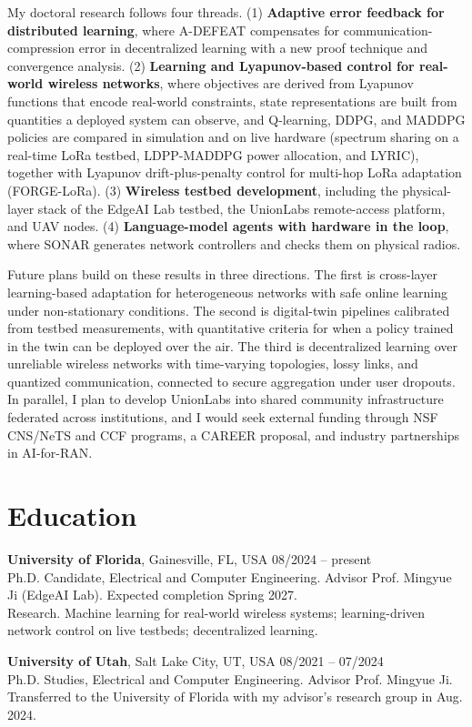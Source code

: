 \documentclass[10pt]{article}
\begin{document}
My doctoral research follows four threads. (1) \textbf{Adaptive error feedback for distributed learning}, where A-DEFEAT compensates for communication-compression error in decentralized learning with a new proof technique and convergence analysis. (2) \textbf{Learning and Lyapunov-based control for real-world wireless networks}, where objectives are derived from Lyapunov functions that encode real-world constraints, state representations are built from quantities a deployed system can observe, and Q-learning, DDPG, and MADDPG policies are compared in simulation and on live hardware (spectrum sharing on a real-time LoRa testbed, LDPP-MADDPG power allocation, and LYRIC), together with Lyapunov drift-plus-penalty control for multi-hop LoRa adaptation (FORGE-LoRa). (3) \textbf{Wireless testbed development}, including the physical-layer stack of the EdgeAI Lab testbed, the UnionLabs remote-access platform, and UAV nodes. (4) \textbf{Language-model agents with hardware in the loop}, where SONAR generates network controllers and checks them on physical radios.

Future plans build on these results in three directions. The first is cross-layer learning-based adaptation for heterogeneous networks with safe online learning under non-stationary conditions. The second is digital-twin pipelines calibrated from testbed measurements, with quantitative criteria for when a policy trained in the twin can be deployed over the air. The third is decentralized learning over unreliable wireless networks with time-varying topologies, lossy links, and quantized communication, connected to secure aggregation under user dropouts. In parallel, I plan to develop UnionLabs into shared community infrastructure federated across institutions, and I would seek external funding through NSF CNS/NeTS and CCF programs, a CAREER proposal, and industry partnerships in AI-for-RAN.

\section*{Education}
\textbf{University of Florida}, Gainesville, FL, USA \hfill 08/2024 -- present\\
Ph.D. Candidate, Electrical and Computer Engineering. Advisor Prof. Mingyue Ji (EdgeAI Lab). Expected completion Spring 2027.\\
Research. Machine learning for real-world wireless systems; learning-driven network control on live testbeds; decentralized learning.

\textbf{University of Utah}, Salt Lake City, UT, USA \hfill 08/2021 -- 07/2024\\
Ph.D. Studies, Electrical and Computer Engineering. Advisor Prof. Mingyue Ji. Transferred to the University of Florida with my advisor's research group in Aug. 2024.
\end{document}
